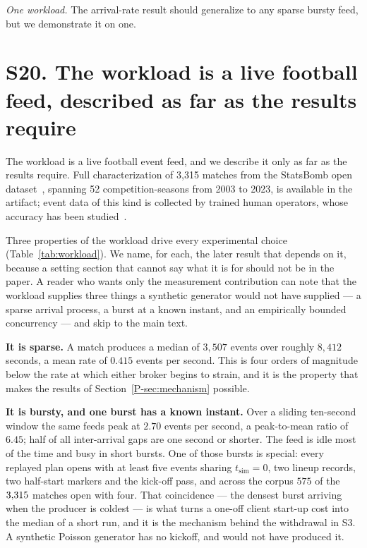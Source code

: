 \documentclass[10pt,journal,onecolumn]{IEEEtran}
\newcommand{\mainModeA}{\ref{P-sec:mechanism}}             %
\begin{document}
\emph{One workload.} The arrival-rate result should generalize to any sparse bursty feed, but we
demonstrate it on one.

\section{S20. The workload is a live football feed, described as far as the results require}

The workload is a live football event feed, and we describe it only as far as the results
require. Full characterization of 3{,}315 matches from the StatsBomb open
dataset~\cite{statsbomb2023}, spanning 52 competition-seasons from 2003 to 2023, is available in
the artifact; event data of this kind is collected by trained human operators, whose accuracy has
been studied~\cite{liu2013interoperator,pappalardo2019public}.

Three properties of the workload drive every experimental choice
(Table~\ref{tab:workload}). We name, for each, the later result that depends on it, because a
setting section that cannot say what it is for should not be in the paper. A reader who wants
only the measurement contribution can note that the workload supplies three things a synthetic
generator would not have supplied --- a sparse arrival process, a burst at a known instant, and
an empirically bounded concurrency --- and skip to the main text.

\textbf{It is sparse.} A match produces a median of $3{,}507$ events over roughly $8{,}412$
seconds, a mean rate of $\mathbf{0.415}$ events per second. This is four orders of magnitude
below the rate at which either broker begins to strain, and it is the property that makes the results of Section~\mainModeA{} possible.

\textbf{It is bursty, and one burst has a known instant.} Over a sliding ten-second window the
same feeds peak at $2.70$ events per second, a peak-to-mean ratio of $6.45$; half of all
inter-arrival gaps are one second or shorter. The feed is idle most of the time and busy in short
bursts. One of those bursts is special: every replayed plan opens with at least five events
sharing $t_{\mathrm{sim}}{=}0$, two lineup records, two half-start markers and the kick-off pass,
and across the corpus $575$ of the $3{,}315$ matches open with four. That coincidence --- the densest burst arriving when the producer
is coldest --- is what turns a one-off client start-up cost into the median of a short run, and it is the mechanism behind the withdrawal in S3. A synthetic Poisson
generator has no kickoff, and would not have produced it.
\end{document}
